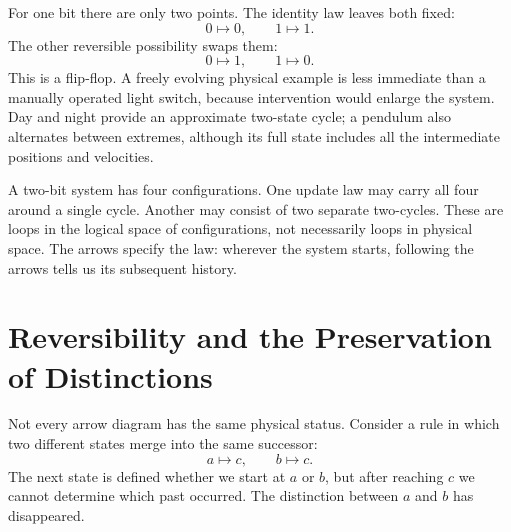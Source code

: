 For one bit there are only two points. The identity law leaves both fixed:
\begin{equation}
  0\mapsto0,
  \qquad
  1\mapsto1.
  \label{eq:l01-identity-update}
\end{equation}
The other reversible possibility swaps them:
\begin{equation}
  0\mapsto1,
  \qquad
  1\mapsto0.
  \label{eq:l01-flip-update}
\end{equation}
This is a flip-flop. A freely evolving physical example is less immediate than a manually operated light switch, because intervention would enlarge the system. Day and night provide an approximate two-state cycle; a pendulum also alternates between extremes, although its full state includes all the intermediate positions and velocities.

\begin{classroomqa}
\end{classroomqa}

A two-bit system has four configurations. One update law may carry all four around a single cycle. Another may consist of two separate two-cycles. These are loops in the logical space of configurations, not necessarily loops in physical space. The arrows specify the law: wherever the system starts, following the arrows tells us its subsequent history.

\section{Reversibility and the Preservation of Distinctions}

Not every arrow diagram has the same physical status. Consider a rule in which two different states merge into the same successor:
\begin{equation}
  a\mapsto c,
  \qquad
  b\mapsto c.
  \label{eq:l01-merging-update}
\end{equation}
The next state is defined whether we start at \(a\) or \(b\), but after reaching \(c\) we cannot determine which past occurred. The distinction between \(a\) and \(b\) has disappeared.

